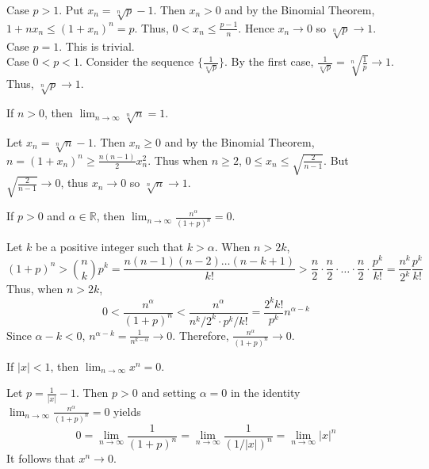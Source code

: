 \documentclass{jacky}
\newcommand{\rr}{\mathbb{R}}
\begin{document}
\begin{pf}
  Case $p>1$. Put $x_n=\sqrt[n]{p}-1$. Then $x_n>0$ and by the Binomial
  Theorem, $1+nx_n\le(1+x_n)^n=p$. Thus, $0<x_n\le\frac{p-1}{n}$. Hence
  $x_n\to0$ so $\sqrt[n]{p}\to1$.\\
  Case $p=1$. This is trivial.\\
  Case $0<p<1$. Consider the sequence $\{\frac{1}{\sqrt[n]{p}}\}$. By the first
  case, $\frac{1}{\sqrt[n]{p}}=\sqrt[n]{\frac{1}{p}}\to1$. Thus,
  $\sqrt[n]{p}\to1$.
\end{pf}

\begin{prop}
  If $n>0$, then $\lim_{n\to\infty}\sqrt[n]{n}=1$.
\end{prop}

\begin{pf}
  Let $x_n=\sqrt[n]{n}-1$. Then $x_n\ge0$ and by the Binomial Theorem,
  $n=(1+x_n)^n\ge\frac{n(n-1)}{2}x_n^2$. Thus when $n\ge2$, $0\le
  x_n\le\sqrt{\frac{2}{n-1}}$. But $\sqrt{\frac{2}{n-1}}\to0$, thus $x_n\to 0$
  so $\sqrt[n]{n}\to1$.
\end{pf}

\begin{prop}
  If $p>0$ and $\alpha\in\rr$, then
  $\lim_{n\to\infty}\frac{n^\alpha}{(1+p)^n}=0$.
\end{prop}

\begin{pf}
  Let $k$ be a positive integer such that $k>\alpha$. When $n>2k$,
  $$(1+p)^n>\binom{n}{k}p^k=\frac{n(n-1)(n-2)\ldots(n-k+1)}{k!}>
  \frac{n}{2}\cdot\frac{n}{2}\cdot\ldots\cdot\frac{n}{2}
  \cdot\frac{p^k}{k!}=\frac{n^k}{2^k}\frac{p^k}{k!}$$
  Thus, when $n>2k$,
  $$0<\frac{n^\alpha}{(1+p)^n}<\frac{n^\alpha}{n^k/2^k\cdot
  p^k/k!}=\frac{2^kk!}{p^k}n^{\alpha-k}$$
  Since $\alpha-k<0$, $n^{\alpha-k}=\frac{1}{n^{k-\alpha}}\to0$. Therefore,
  $\frac{n^\alpha}{(1+p)^n}\to0$.
\end{pf}

\begin{prop}
  If $|x|<1$, then $\lim_{n\to\infty}x^n=0$.
\end{prop}

\begin{pf}
  Let $p=\frac{1}{|x|}-1$. Then $p>0$ and setting $\alpha=0$ in the identity
  $\lim_{n\to\infty}\frac{n^\alpha}{(1+p)^n}=0$ yields
  $$0=\lim_{n\to\infty}\frac{1}{(1+p)^n}=\lim_{n\to\infty}\frac{1}{(1/|x|)^n}
  =\lim_{n\to\infty}|x|^n$$
  It follows that $x^n\to0$.
\end{pf}
\end{document}
